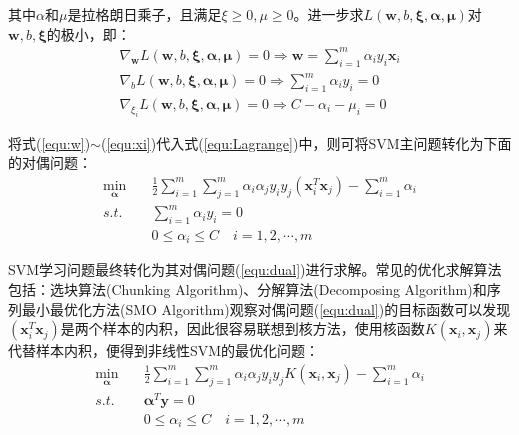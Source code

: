 其中$\alpha$和$\mu$是拉格朗日乘子，且满足$\xi \ge 0,\mu \ge 0$。进一步求$L(\mathbf{w},b,\mathbf{\xi},\mathbf{\alpha},\mathbf{\mu})$对$\mathbf{w},b,\mathbf{\xi}$的极小，即：
\begin{align} %
   \nabla_{\mathbf{w}}L(\mathbf{w},b,\mathbf{\xi},\mathbf{\alpha},\mathbf{\mu})=0 \Rightarrow \mathbf{w}=\sum^m_{i=1}\alpha_iy_i\mathbf{x}_i \label{equ:w} \\
   \nabla_{b}L(\mathbf{w},b,\mathbf{\xi},\mathbf{\alpha},\mathbf{\mu})=0 \Rightarrow \sum^m_{i=1}\alpha_iy_i=0 \label{equ:b} \\
   \nabla_{\xi_i}L(\mathbf{w},b,\mathbf{\xi},\mathbf{\alpha},\mathbf{\mu})=0 \Rightarrow C-\alpha_i-\mu_i=0 \label{equ:xi}
\end{align}

将式(\ref{equ:w})$\sim$(\ref{equ:xi})代入式(\ref{equ:Lagrange})中，则可将SVM主问题转化为下面的对偶问题：
\begin{equation}
\begin{split} %
   \min_{\mathbf{\alpha}} \quad & \frac{1}{2}\sum^m_{i=1}\sum^m_{j=1}\alpha_i\alpha_jy_iy_j(\mathbf{x}_i^T\mathbf{x}_j)-\sum^m_{i=1}\alpha_i \\
   s.t. \quad & \sum^m_{i=1}\alpha_iy_i=0 \\
   & 0 \le \alpha_i \le C \quad  i=1,2,\cdots,m
   \label{equ:dual}
\end{split}
\end{equation}

SVM学习问题最终转化为其对偶问题(\ref{equ:dual})进行求解。常见的优化求解算法包括：选块算法(Chunking Algorithm)、分解算法(Decomposing Algorithm)和序列最小最优化方法(SMO Algorithm)观察对偶问题(\ref{equ:dual})的目标函数可以发现$(\mathbf{x}_i^T\mathbf{x}_j)$是两个样本的内积，因此很容易联想到核方法，使用核函数$K(\mathbf{x}_i,\mathbf{x}_j)$来代替样本内积，便得到非线性SVM的最优化问题：
\begin{equation}
\begin{split} %
   \min_{\mathbf{\alpha}} \quad & \frac{1}{2}\sum^m_{i=1}\sum^m_{j=1}\alpha_i\alpha_jy_iy_jK(\mathbf{x}_i,\mathbf{x}_j)-\sum^m_{i=1}\alpha_i \\
   s.t. \quad & \mathbf{\alpha}^T\mathbf{y}=0 \\
   & 0 \le \alpha_i \le C \quad  i=1,2,\cdots,m
   \label{equ:dual-kernel}
\end{split}
\end{equation}

